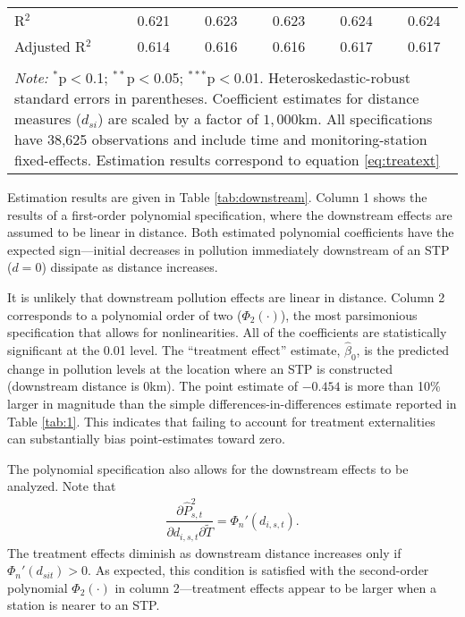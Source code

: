 \documentclass[12pt]{article}
\newcommand{\der}[2]{\ensuremath{\dfrac{\partial #1}{\partial 
#2}}}
\newcommand{\anum}[1]{\begin{align}#1\end{align}}
\newcommand{\did}{differences-in-differences }
\begin{document}
\begin{table}[t!]
\begin{tabular}{@{\extracolsep{5pt}}llccccc}
\multicolumn{2}{l}{R$^{2}$}  & 0.621 & 0.623 & 0.623 & 0.624 & 0.624 \\ 
\multicolumn{2}{l}{Adjusted R$^{2}$} & 0.614 & 0.616 & 0.616 & 0.617 & 0.617 \\ 
\hline 
\hline \\[-1.8ex] 
\multicolumn{7}{p{.95\textwidth}}{\footnotesize{\textit{Note: } $^{*}$p$<$0.1; $^{**}$p$<$0.05; $^{***}$p$<$0.01.  Heteroskedastic-robust standard errors in parentheses. Coefficient estimates for distance measures ($d_{si}$) are scaled by a factor of $1,000$km. All specifications have 38,625 observations and include time and monitoring-station fixed-effects. Estimation results correspond to equation \eqref{eq:treatext}}} \\ 
\end{tabular} 
\end{table} 

Estimation results are given in Table \ref{tab:downstream}. Column 1 shows the results of a first-order polynomial specification, where the downstream effects are assumed to be linear in distance. Both estimated polynomial coefficients have the expected sign---initial decreases in pollution immediately downstream of an STP ($d=0$) dissipate as distance increases.

It is unlikely that downstream pollution effects are linear in distance. Column 2 corresponds to a polynomial order of two ($\Phi_2(\cdot)$), the most parsimonious specification that allows for nonlinearities. All of the coefficients are statistically significant at the 0.01 level. The ``treatment effect'' estimate, $\hat{\beta}_0$, is the predicted change in pollution levels at the location where an STP is constructed (downstream distance is 0km). The point estimate of $-0.454$ is more than 10\% larger in magnitude than the simple \did estimate reported in Table \ref{tab:1}. This indicates that failing to account for treatment externalities can substantially bias point-estimates toward zero. 

The polynomial specification also allows for the downstream effects to be analyzed. Note that 
\anum{ \der{\widehat{P}_{s,t}^2}{d_{i,s,t} \partial \widetilde{T}} = \Phi_n'(d_{i,s,t}). \label{eq:deriv} }
The treatment effects diminish as downstream distance increases only if $\Phi_n'(d_{sit}) > 0$. As expected, this condition is satisfied with the second-order polynomial $\Phi_2(\cdot)$ in column 2---treatment effects appear to be larger when a station is nearer to an STP. 
\end{document}

